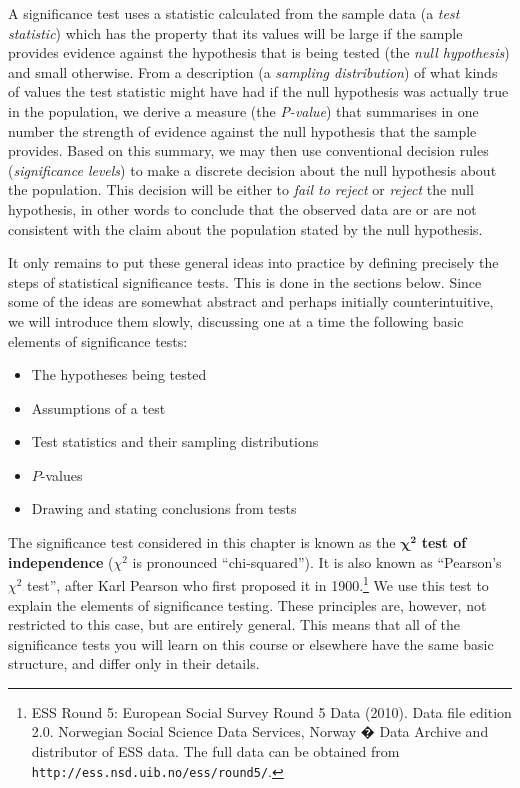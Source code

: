 \documentclass[11pt,a4paper,openany]{book}
\let\rmarkdownfootnote\footnote%
\def\footnote{\protect\rmarkdownfootnote}
\begin{document}
A significance test uses a statistic calculated from the sample data (a
\emph{test statistic}) which has the property that its values will be
large if the sample provides evidence against the hypothesis that is
being tested (the \emph{null hypothesis}) and small otherwise. From a
description (a \emph{sampling distribution}) of what kinds of values the
test statistic might have had if the null hypothesis was actually true
in the population, we derive a measure (the \emph{P-value}) that
summarises in one number the strength of evidence against the null
hypothesis that the sample provides. Based on this summary, we may then
use conventional decision rules (\emph{significance levels}) to make a
discrete decision about the null hypothesis about the population. This
decision will be either to \emph{fail to reject} or \emph{reject} the
null hypothesis, in other words to conclude that the observed data are
or are not consistent with the claim about the population stated by the
null hypothesis.

It only remains to put these general ideas into practice by defining
precisely the steps of statistical significance tests. This is done in
the sections below. Since some of the ideas are somewhat abstract and
perhaps initially counterintuitive, we will introduce them slowly,
discussing one at a time the following basic elements of significance
tests:

\begin{itemize}
\item
  The hypotheses being tested
\item
  Assumptions of a test
\item
  Test statistics and their sampling distributions
\item
  \(P\)-values
\item
  Drawing and stating conclusions from tests
\end{itemize}

The significance test considered in this chapter is known as the
\(\boldsymbol{\chi^{2}}\) \textbf{test of independence} (\(\chi^{2}\) is
pronounced ``chi-squared''). It is also known as ``Pearson's
\(\chi^{2}\) test'', after Karl Pearson who first proposed it in
1900.\footnote{ESS Round 5: European Social Survey Round 5 Data (2010).
  Data file edition 2.0. Norwegian Social Science Data Services, Norway
  � Data Archive and distributor of ESS data. The full data can be
  obtained from \texttt{http://ess.nsd.uib.no/ess/round5/}.} We use this
test to explain the elements of significance testing. These principles
are, however, not restricted to this case, but are entirely general.
This means that all of the significance tests you will learn on this
course or elsewhere have the same basic structure, and differ only in
their details.
\end{document}
